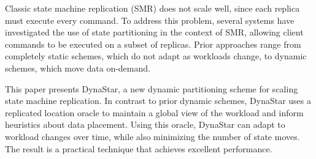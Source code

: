 
Classic state machine replication (SMR) does not scale well, since
each replica must execute every command.  To address this problem,
several systems have investigated the use of state partitioning in the
context of SMR, allowing client commands to be executed on a subset of
replicas. Prior approaches range from completely static schemes, which do not
adapt as workloads change, to dynamic schemes, which move data on-demand.


This paper presents DynaStar, a new dynamic partitioning scheme for
scaling state machine replication. In contrast to prior dynamic
schemes, DynaStar uses a replicated location oracle to maintain a global view
of the workload and inform heuristics about data placement. Using this
oracle, DynaStar can adapt to workload changes over time,
while also minimizing the number of state moves. The result is a
practical technique that achieves excellent performance.


